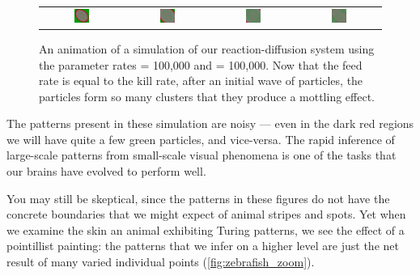 \begin{figure}[h]
\begin{tabular}{c c c c}
\includegraphics[width = 0.19\textwidth]{../images/predator_prey_11_by_11_f_1_k_1_i4.png} & \includegraphics[width = 0.19\textwidth]{../images/../images/predator_prey_11_by_11_f_1_k_1_i5.png} & \includegraphics[width = 0.19\textwidth]{../images/../images/predator_prey_11_by_11_f_1_k_1_i6.png} & \includegraphics[width = 0.19\textwidth]{../images/../images/predator_prey_11_by_11_f_1_k_1_i7.png}
\end{tabular}
\caption{An animation of a simulation of our reaction-diffusion system using the parameter rates  = 100,000 and  = 100,000. Now that the feed rate is equal to the kill rate, after an initial wave of  particles, the  particles form so many clusters that they produce a mottling effect.}
\label{fig:k=100000_f=100000}
\end{figure}

\FloatBarrier

The patterns present in these simulation are noisy --- even in the dark red regions we will have quite a few green particles, and vice-versa. The rapid inference of large-scale patterns from small-scale visual phenomena is one of the tasks that our brains have evolved to perform well.

You may still be skeptical, since the patterns in these figures do not have the concrete boundaries that we might expect of animal stripes and spots. Yet when we examine the skin an animal exhibiting Turing patterns, we see the effect of a pointillist painting: the patterns that we infer on a higher level are just the net result of many varied individual points (\autoref{fig:zebrafish_zoom}).\\

